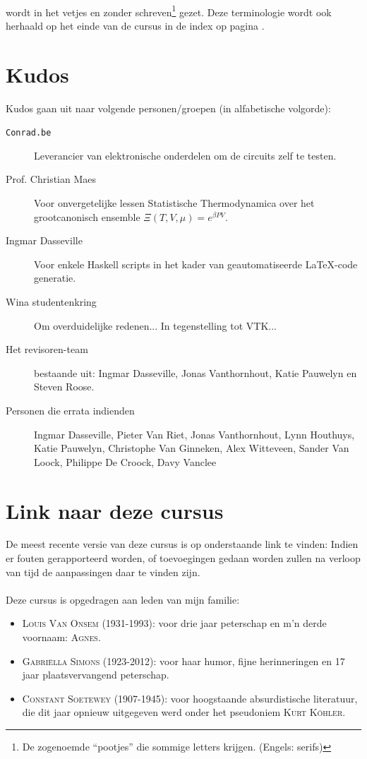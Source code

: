 \documentclass[a4paper,10pt,titlepage]{book}
\begin{document}
\begin{it}
\paragraph{}
 wordt in het vetjes en zonder schreven\footnote{De zogenoemde ``pootjes'' die sommige letters krijgen. (Engels: serifs)} gezet. Deze terminologie wordt ook herhaald op het einde van de cursus in de index op pagina \pageref{idx}.
\section*{Kudos}
Kudos gaan uit naar volgende personen/groepen (in alfabetische volgorde):
\begin{description}
 \item[\texttt{Conrad.be}] Leverancier van elektronische onderdelen om de circuits zelf te testen.
 \item[Prof. Christian Maes] Voor onvergetelijke lessen Statistische Thermodynamica over het grootcanonisch ensemble $\Xi\left(T,V,\mu\right)=e^{\beta PV}$.
 \item[Ingmar Dasseville] Voor enkele Haskell scripts in het kader van geautomatiseerde \LaTeX-code generatie.
 \item[Wina studentenkring] Om overduidelijke redenen... In tegenstelling tot VTK...
 \item[Het revisoren-team] bestaande uit: Ingmar Dasseville, Jonas Vanthornhout, Katie Pauwelyn en Steven Roose.
 \item[Personen die errata indienden] Ingmar Dasseville, Pieter Van Riet, Jonas Vanthornhout, Lynn Houthuys, Katie Pauwelyn, Christophe Van Ginneken, Alex Witteveen, Sander Van Loock, Philippe De Croock, Davy Vanclee
\end{description}
\section*{Link naar deze cursus}
De meest recente versie van deze cursus is op onderstaande link te vinden:
Indien er fouten gerapporteerd worden, of toevoegingen gedaan worden zullen na verloop van tijd de aanpassingen daar te vinden zijn.
\paragraph{}Deze cursus is opgedragen aan leden van mijn familie:
\begin{itemize}
 \item \textsc{Louis Van Onsem (1931-1993)}: voor drie jaar peterschap en m'n derde voornaam: \textsc{Agnes}.%
 \item \textsc{Gabri\"ella Simons (1923-2012)}: voor haar humor, fijne herinneringen en 17 jaar plaatsvervangend peterschap.
 \item \textsc{Constant Soetewey (1907-1945)}: voor hoogstaande absurdistische literatuur, die dit jaar opnieuw uitgegeven werd\cite{Kohler} onder het pseudoniem \textsc{Kurt K\"ohler}.
\end{itemize}
\end{it}
\end{document}
